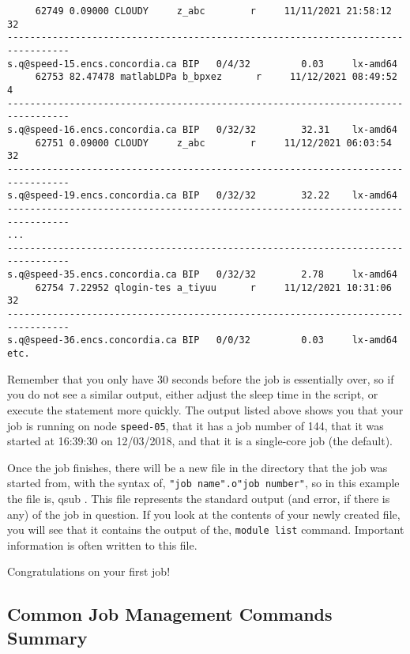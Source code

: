 \documentclass{easychair}
\begin{document}
\begin{verbatim}
     62749 0.09000 CLOUDY     z_abc        r     11/11/2021 21:58:12    32
---------------------------------------------------------------------------------
s.q@speed-15.encs.concordia.ca BIP   0/4/32         0.03     lx-amd64
     62753 82.47478 matlabLDPa b_bpxez      r     11/12/2021 08:49:52     4
---------------------------------------------------------------------------------
s.q@speed-16.encs.concordia.ca BIP   0/32/32        32.31    lx-amd64
     62751 0.09000 CLOUDY     z_abc        r     11/12/2021 06:03:54    32
---------------------------------------------------------------------------------
s.q@speed-19.encs.concordia.ca BIP   0/32/32        32.22    lx-amd64
---------------------------------------------------------------------------------
...
---------------------------------------------------------------------------------
s.q@speed-35.encs.concordia.ca BIP   0/32/32        2.78     lx-amd64
     62754 7.22952 qlogin-tes a_tiyuu      r     11/12/2021 10:31:06    32
---------------------------------------------------------------------------------
s.q@speed-36.encs.concordia.ca BIP   0/0/32         0.03     lx-amd64
etc.
\end{verbatim}
\normalsize

Remember that you only have 30 seconds before the job is essentially over, so 
if you do not see a similar output, either adjust the sleep time in the 
script, or execute the  statement more quickly. The  
output listed above shows you that your job is 
running on node \texttt{speed-05}, that it has a job number of 144, that it 
was started at 16:39:30 on 12/03/2018, and that it is a single-core job (the 
default). 

Once the job finishes, there will be a new file in the directory that the job 
was started from, with the syntax of, \texttt{"job name".o"job number"}, so 
in this example the file is, qsub . This file represents the 
standard output (and error, if there is any) of the job in question. If you 
look at the contents of your newly created file, you will see that it 
contains the output of the, \texttt{module list} command. 
Important information is often written to this file.

Congratulations on your first job! 

\subsection{Common Job Management Commands Summary}
\label{sect:job-management-commands}
\end{document}
